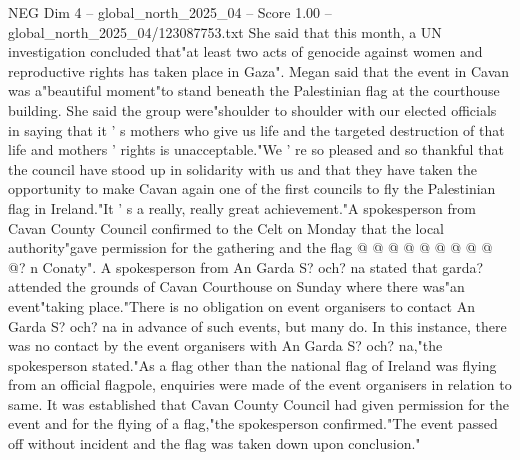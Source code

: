 \begin{textsample}{NEG Dim 4 – global\_north\_2025\_04 – Score 1.00 – global\_north\_2025\_04/123087753.txt}
She said that this month, a UN investigation concluded that"at least two acts of genocide against women and reproductive rights has taken place in Gaza".
Megan said that the event in Cavan was a"beautiful moment"to stand beneath the Palestinian flag at the courthouse building.
She said the group were"shoulder to shoulder with our elected officials in saying that it ' s mothers who give us life and the targeted destruction of that life and mothers ' rights is unacceptable."We ' re so pleased and so thankful that the council have stood up in solidarity with us and that they have taken the opportunity to make Cavan again one of the first councils to fly the Palestinian flag in Ireland."It ' s a really, really great achievement."A spokesperson from Cavan County Council confirmed to the Celt on Monday that the local authority"gave permission for the gathering and the flag @ @ @ @ @ @ @ @ @ @? n Conaty".
A spokesperson from An Garda S? och? na stated that garda? attended the grounds of Cavan Courthouse on Sunday where there was"an event"taking place."There is no obligation on event organisers to contact An Garda S? och? na in advance of such events, but many do.
In this instance, there was no contact by the event organisers with An Garda S? och? na,"the spokesperson stated."As a flag other than the national flag of Ireland was flying from an official flagpole, enquiries were made of the event organisers in relation to same.
It was established that Cavan County Council had given permission for the event and for the flying of a flag,"the spokesperson confirmed."The event passed off without incident and the flag was taken down upon conclusion."

\end{textsample}
